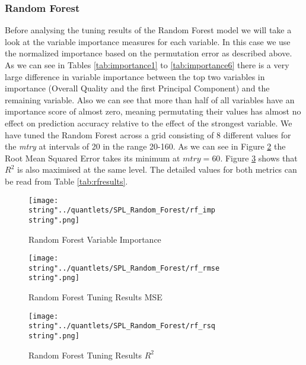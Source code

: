 \subsubsection{Random Forest}
Before analysing the tuning results of the Random Forest model we will take a look at the variable importance measures for each variable. In this case we use the normalized importance based on the permutation error as described above. As we can see in Tables \ref{tab:importance1} to \ref{tab:importance6} there is a very large difference in variable importance between the top two variables in importance (Overall Quality and the first Principal Component) and the remaining variable. Also we can see that more than half of all variables have an importance score of almost zero, meaning permutating their values has almost no effect on prediction accuracy relative to the effect of the strongest variable. 
We have tuned the Random Forest across a grid consisting of 8 different values for the \textit{mtry} at intervals of 20 in the range 20-160. As we can see in Figure \ref{fig:rf_rmse} the Root Mean Squared Error takes its minimum at $mtry = 60$. Figure \ref{fig:rf_rsq} shows that $R^2$ is also maximised at the same level. The detailed values for both metrics can be read from Table \ref{tab:rfresults}.







\begin{figure}
  \centering
\texttt{[image: \\string"../quantlets/SPL\_Random\_Forest/rf\_imp\\string".png]}
  \caption{Random Forest Variable Importance}\label{fig:rf_imp}
\end{figure}

\begin{figure}
  \centering
\texttt{[image: \\string"../quantlets/SPL\_Random\_Forest/rf\_rmse\\string".png]}
  \caption{Random Forest Tuning Results MSE}\label{fig:rf_rmse}
\end{figure}

\begin{figure}
  \centering
\texttt{[image: \\string"../quantlets/SPL\_Random\_Forest/rf\_rsq\\string".png]}
  \caption{Random Forest Tuning Results $R^2$}\label{fig:rf_rsq}
\end{figure}